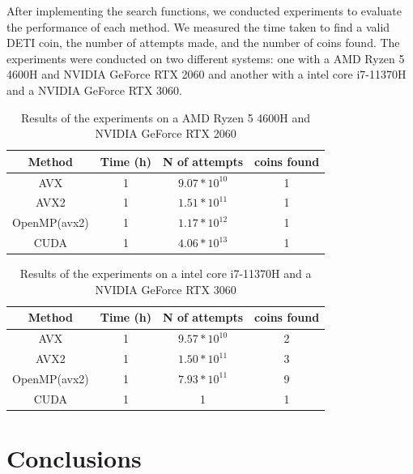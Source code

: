 \documentclass[a4paper,12pt]{article}
\begin{document}
After implementing the search functions, we conducted experiments to evaluate the performance
of each method. We measured the time taken to find a valid DETI coin, the number of attempts
made, and the number of coins found. The experiments were conducted on two different systems:
one with a AMD Ryzen 5 4600H and NVIDIA GeForce RTX 2060 and another with a intel core i7-11370H and a NVIDIA GeForce RTX 
3060.

\begin{table}[H]
    \centering
    \begin{tabular}{|c|c|c|c|}
        \hline
        \textbf{Method} & \textbf{Time (h)} & \textbf{N of attempts} & \textbf{coins found} \\
        \hline
        AVX & 1 & $9.07*10^{10}$ & 1  \\
        AVX2 & 1 & $1.51*10^{11}$ & 1 \\
        OpenMP(avx2) & 1 & $1.17*10^{12}$ & 1 \\
        CUDA & 1 & $4.06*10^{13}$ & 1  \\
        \hline
    \end{tabular}
    \caption{Results of the experiments on a AMD Ryzen 5 4600H and NVIDIA GeForce RTX 2060}
    \label{tab:results1}
\end{table}

\begin{table}[H]
    \centering
    \begin{tabular}{|c|c|c|c|}
        \hline
        \textbf{Method} & \textbf{Time (h)} & \textbf{N of attempts} & \textbf{coins found} \\
        \hline
        AVX & 1 & $9.57*10^{10}$ & 2  \\
        AVX2 & 1 &  $1.50*10^{11}$ & 3 \\
        OpenMP(avx2) & 1 & $7.93*10^{11}$ & 9 \\
        CUDA & 1 & 1 & 1  \\
        \hline
    \end{tabular}
    \caption{Results of the experiments on a intel core i7-11370H and a NVIDIA GeForce RTX 3060}
    \label{tab:results2}
\end{table}



\section{Conclusions}
\label{sec:discussion}
\end{document}

